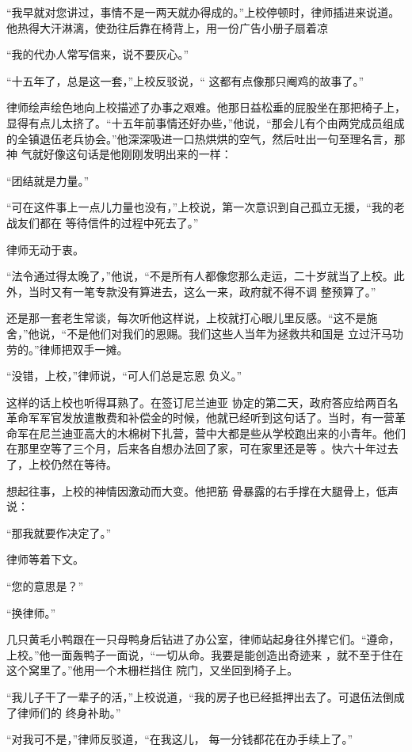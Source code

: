 \documentclass{article}
\begin{document}
“我早就对您讲过，事情不是一两天就办得成的。”上校停顿时，律师插进来说道。他热得大汗淋漓，使劲往后靠在椅背上，用一份广告小册子扇着凉


“我的代办人常写信来，说不要灰心。” 

“十五年了，总是这一套，”上校反驳说，“
这都有点像那只阉鸡的故事了。” 

律师绘声绘色地向上校描述了办事之艰难。他那日益松垂的屁股坐在那把椅子上，显得有点儿太挤了。“十五年前事情还好办些，”他说，“那会儿有个由两党成员组成的全镇退伍老兵协会。”他深深吸进一口热烘烘的空气，然后吐出一句至理名言，那神
气就好像这句话是他刚刚发明出来的一样： 


\newpage

“团结就是力量。” 

“可在这件事上一点儿力量也没有，”上校说，第一次意识到自己孤立无援，“我的老战友们都在
等待信件的过程中死去了。” 


律师无动于衷。 

“法令通过得太晚了，”他说，“不是所有人都像您那么走运，二十岁就当了上校。此外，当时又有一笔专款没有算进去，这么一来，政府就不得不调
整预算了。” 

还是那一套老生常谈，每次听他这样说，上校就打心眼儿里反感。“这不是施舍，”他说，“不是他们对我们的恩赐。我们这些人当年为拯救共和国是
立过汗马功劳的。”律师把双手一摊。 

“没错，上校，”律师说，“可人们总是忘恩
负义。” 

这样的话上校也听得耳熟了。在签订尼兰迪亚
\newpage
协定的第二天，政府答应给两百名革命军军官发放遣散费和补偿金的时候，他就已经听到这句话了。当时，有一营革命军在尼兰迪亚高大的木棉树下扎营，营中大都是些从学校跑出来的小青年。他们在那里空等了三个月，后来各自想办法回了家，可在家里还是等
。快六十年过去了，上校仍然在等待。 

想起往事，上校的神情因激动而大变。他把筋
骨暴露的右手撑在大腿骨上，低声说： 


“那我就要作决定了。” 


律师等着下文。 


“您的意思是？” 


“换律师。” 

几只黄毛小鸭跟在一只母鸭身后钻进了办公室，律师站起身往外撵它们。“遵命，上校。”他一面轰鸭子一面说，“一切从命。我要是能创造出奇迹来
\newpage
，就不至于住在这个窝里了。”他用一个木栅栏挡住
院门，又坐回到椅子上。 

“我儿子干了一辈子的活，”上校说道，“我的房子也已经抵押出去了。可退伍法倒成了律师们的
终身补助。” 

“对我可不是，”律师反驳道，“在我这儿，
每一分钱都花在办手续上了。” 
\end{document}
